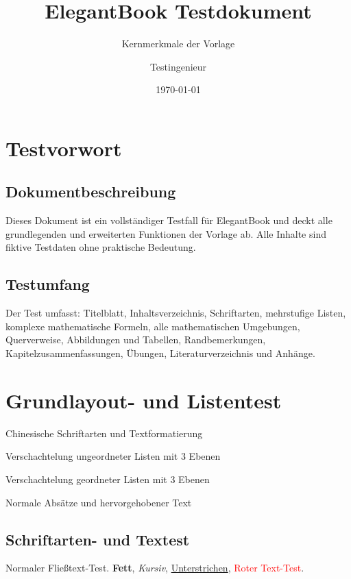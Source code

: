 \documentclass[de]{../../elegantbook}
\title{ElegantBook Testdokument}
\subtitle{Kernmerkmale der Vorlage}
\author{Testingenieur}
\institute{Vorlagen-Testgruppe}
\date{\today}
\begin{document}
\maketitle
\frontmatter
\tableofcontents

\setcounter{page}{0}
\chapter*{Testvorwort}
\section*{Dokumentbeschreibung}
Dieses Dokument ist ein vollständiger Testfall für ElegantBook und deckt alle grundlegenden und erweiterten Funktionen der Vorlage ab. Alle Inhalte sind fiktive Testdaten ohne praktische Bedeutung.
\newpage
\section*{Testumfang}
Der Test umfasst: Titelblatt, Inhaltsverzeichnis, Schriftarten, mehrstufige Listen, komplexe mathematische Formeln, alle mathematischen Umgebungen, Querverweise, Abbildungen und Tabellen, Randbemerkungen, Kapitelzusammenfassungen, Übungen, Literaturverzeichnis und Anhänge.

\mainmatter

\chapter{Grundlayout- und Listentest}
\begin{introduction}
\item Chinesische Schriftarten und Textformatierung
\item Verschachtelung ungeordneter Listen mit 3 Ebenen
\item Verschachtelung geordneter Listen mit 3 Ebenen
\item Normale Absätze und hervorgehobener Text
\end{introduction}

\section{Schriftarten- und Textest}
Normaler Fließtext-Test. \textbf{Fett}, \textit{Kursiv}, \underline{Unterstrichen}, \textcolor{red}{Roter Text-Test}.
\end{document}
